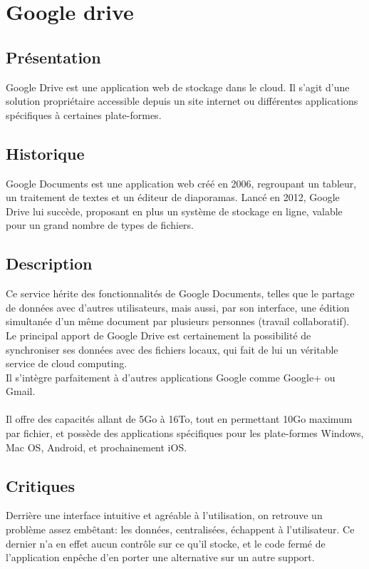 \chapter{Google drive}
\thispagestyle{EIP} %

\section{Présentation}
Google Drive est une application web de stockage dans le cloud. Il s'agit d'une solution propriétaire accessible depuis un site internet ou différentes applications spécifiques à certaines plate-formes.

\section{Historique}
Google Documents est une application web créé en 2006, regroupant un tableur, un traitement de textes et un éditeur de diaporamas.
Lancé en 2012, Google Drive lui succède, proposant en plus un système de stockage en ligne, valable pour un grand nombre de types de fichiers.\\

\section{Description}
Ce service hérite des fonctionnalités de Google Documents, telles que le partage de données avec d'autres utilisateurs, mais aussi, par son interface, une édition simultanée d'un même document par plusieurs personnes (travail collaboratif).\\
Le principal apport de Google Drive est certainement la possibilité de synchroniser ses données avec des fichiers locaux, qui fait de lui un véritable service de cloud computing.\\
Il s'intègre parfaitement à d'autres applications Google comme Google+ ou Gmail.\\
\\
Il offre des capacités allant de 5Go à 16To, tout en permettant 10Go maximum par fichier, et possède des applications spécifiques pour les plate-formes Windows, Mac OS, Android, et prochainement iOS.\\

\section{Critiques}
Derrière une interface intuitive et agréable à l'utilisation, on retrouve un problème assez embêtant: les données, centralisées, échappent à l'utilisateur. Ce dernier n'a en effet aucun contrôle sur ce qu'il stocke, et le code fermé de l'application enpêche d'en porter une alternative sur un autre support.
